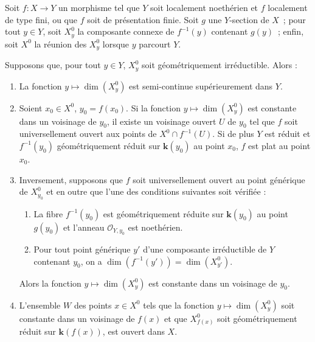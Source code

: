 \begin{proposition}[15.6.6]
\label{IV.15.6.6-fr}
Soit $f:X\to Y$ un morphisme tel que $Y$ soit localement noethérien et $f$ localement de type fini, ou que $f$ soit de présentation finie. Soit $g$ une $Y$-section de $X$~; pour tout $y\in Y$, soit $X_y^0$ la composante connexe de $f^{-1}(y)$ contenant $g(y)$~; enfin, soit $X^0$ la réunion des $X_y^0$ lorsque $y$ parcourt $Y$.

Supposons que, pour tout $y\in Y$, $X_y^0$ soit géométriquement irréductible. Alors :
\begin{enumerate}[label=\emph{(\roman*)}]
  \item La fonction $y\mapsto\dim(X_y^0)$ est semi-continue supérieurement dans $Y$.
  \item Soient $x_0\in X^0$, $y_0=f(x_0)$. Si la fonction $y\mapsto\dim(X_y^0)$ est constante dans un voisinage de $y_0$, il existe un voisinage ouvert $U$ de $y_0$ tel que $f$ soit universellement ouvert aux points de $X^0\cap f^{-1}(U)$. Si de plus $Y$ est réduit et $f^{-1}(y_0)$ géométriquement réduit sur $\mathbf{k}(y_0)$ au point $x_0$, $f$ est plat au point $x_0$.
  \item Inversement, supposons que $f$ soit universellement ouvert au point générique de $X_{y_0}^0$ et en outre que l'une des conditions suivantes soit vérifiée :
  \begin{enumerate}
    \item[$\alpha$)] La fibre $f^{-1}(y_0)$ est géométriquement réduite sur $\mathbf{k}(y_0)$ au point $g(y_0)$ et l'anneau $\mathcal O_{Y,y_0}$ est noethérien.
    \item[$\beta$)] Pour tout point générique $y'$ d'une composante irréductible de $Y$ contenant $y_0$, on a $\dim(f^{-1}(y'))=\dim(X_{y'}^0)$.
  \end{enumerate}
  Alors la fonction $y\mapsto\dim(X_y^0)$ est constante dans un voisinage de $y_0$.
  \item L'ensemble $W$ des points $x\in X^0$ tels que la fonction $y\mapsto\dim(X_y^0)$ soit constante dans un voisinage de $f(x)$ et que $X_{f(x)}^0$ soit géométriquement réduit sur $\mathbf{k}(f(x))$, est ouvert dans $X$.
\end{enumerate}
\end{proposition}

